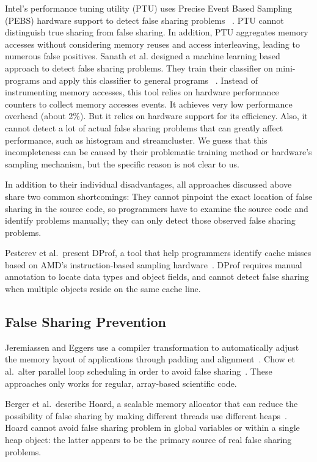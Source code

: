 Intel's performance tuning utility (PTU) uses Precise Event Based Sampling (PEBS) hardware support to detect false sharing problems ~\cite{detect:ptu, detect:intel}.  PTU cannot distinguish true sharing from false sharing. In addition, PTU aggregates memory accesses without considering memory reuses and access interleaving, leading to numerous false positives. Sanath et al. designed a machine learning based approach to detect false sharing problems. They train their classifier on mini-programs and apply this classifier to general programs ~\cite{mldetect}. Instead of instrumenting memory accesses, this tool relies on hardware performance counters to collect memory accesses events. It achieves very low performance overhead (about 2\%). But it relies on hardware support for its efficiency.  Also, it cannot detect a lot of actual false sharing problems that can greatly affect performance, such as histogram and streamcluster. We guess that this incompleteness can be caused by their problematic training method or hardware's sampling mechanism, but the specific reason is not clear to us. 

In addition to their individual disadvantages,
all approaches discussed above share two common shortcomings:  
They cannot pinpoint the exact location of false sharing in the source code, so programmers have to examine the source code and identify problems manually; they can only detect those observed false sharing problems. 

Pesterev et al.\ present DProf, a tool that help programmers identify cache misses based on AMD's instruction-based sampling hardware~\cite{DProf}. DProf requires manual annotation to locate data types and object fields, and cannot detect false sharing when multiple objects reside on the same cache line.

\subsection{False Sharing Prevention}
\label{sec:fspreventwork}
Jeremiassen and Eggers use a compiler transformation to automatically adjust the memory layout of applications through padding and alignment~\cite{falseshare:compile}. Chow et al.\ alter parallel loop scheduling in order to avoid false
sharing~\cite{falseshare:schedule}. These approaches only works for regular, array-based scientific code.

Berger et al.\ describe Hoard, a scalable memory allocator that can reduce the possibility of false sharing by making different threads use different heaps~\cite{Hoard}. Hoard cannot avoid false sharing problem in global variables or within
a single heap object: the latter appears to be the primary source of real false sharing problems.

